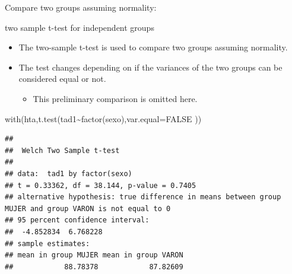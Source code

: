 \documentclass[
  ignorenonframetext,
]{beamer}
\newenvironment{Shaded}{\begin{snugshade}}{\end{snugshade}}
\newcommand{\AttributeTok}[1]{\textcolor[rgb]{0.77,0.63,0.00}{#1}}
\newcommand{\ConstantTok}[1]{\textcolor[rgb]{0.00,0.00,0.00}{#1}}
\newcommand{\FunctionTok}[1]{\textcolor[rgb]{0.00,0.00,0.00}{#1}}
\newcommand{\NormalTok}[1]{#1}
\newcommand{\SpecialCharTok}[1]{\textcolor[rgb]{0.00,0.00,0.00}{#1}}
\providecommand{\tightlist}{%
  \setlength{\itemsep}{0pt}\setlength{\parskip}{0pt}}
\begin{document}
\begin{frame}[fragile]{Compare two groups assuming normality:}
\protect\hypertarget{compare-two-groups-assuming-normality}{}
\begin{block}{two sample t-test for independent groups}
\protect\hypertarget{two-sample-t-test-for-independent-groups}{}
\begin{itemize}
\item
  The two-sample t-test is used to compare two groups assuming
  normality.
\item
  The test changes depending on if the variances of the two groups can
  be considered equal or not.

  \begin{itemize}
  \tightlist
  \item
    This preliminary comparison is omitted here.
  \end{itemize}
\end{itemize}

\tiny

\begin{Shaded}
\begin{Highlighting}[]
\FunctionTok{with}\NormalTok{(hta,}\FunctionTok{t.test}\NormalTok{(tad1}\SpecialCharTok{\textasciitilde{}}\FunctionTok{factor}\NormalTok{(sexo),}\AttributeTok{var.equal=}\ConstantTok{FALSE}\NormalTok{ ))}
\end{Highlighting}
\end{Shaded}

\begin{verbatim}
## 
##  Welch Two Sample t-test
## 
## data:  tad1 by factor(sexo)
## t = 0.33362, df = 38.144, p-value = 0.7405
## alternative hypothesis: true difference in means between group MUJER and group VARON is not equal to 0
## 95 percent confidence interval:
##  -4.852834  6.768228
## sample estimates:
## mean in group MUJER mean in group VARON 
##            88.78378            87.82609
\end{verbatim}
\end{block}
\end{frame}
\end{document}
